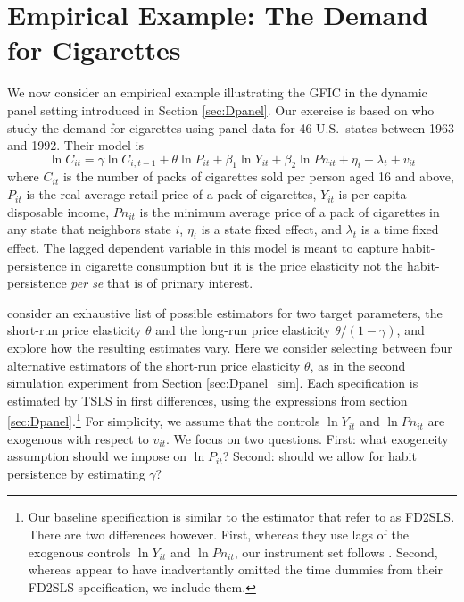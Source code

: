 \section{Empirical Example: The Demand for Cigarettes}
\label{sec:cigarettes}
We now consider an empirical example illustrating the GFIC in the dynamic panel setting introduced in Section \ref{sec:Dpanel}.
Our exercise is based on \cite{BaltagiEtAl2000} who study the demand for cigarettes using panel data for 46 U.S.\ states between 1963 and 1992. 
Their model is
\[
  \ln C_{it} =  \gamma \ln C_{i,t-1} + \theta \ln P_{it} + \beta_1 \ln Y_{it} + \beta_2 \ln Pn_{it} + \eta_i + \lambda_t + v_{it}
\] 
where $C_{it}$ is the number of packs of cigarettes sold per person aged 16 and above, $P_{it}$ is the real average retail price of a pack of cigarettes, $Y_{it}$ is per capita disposable income, $Pn_{it}$ is the minimum average price of a pack of cigarettes in any state that neighbors state $i$, $\eta_i$ is a state fixed effect, and $\lambda_t$ is a time fixed effect.
The lagged dependent variable in this model is meant to capture habit-persistence in cigarette consumption but it is the price elasticity not the habit-persistence \emph{per se} that is of primary interest. 

\cite{BaltagiEtAl2000} consider an exhaustive list of possible estimators for two target parameters, the short-run price elasticity $\theta$ and the long-run price elasticity $\theta/(1 - \gamma)$, and explore how the resulting estimates vary.
Here we consider selecting between four alternative estimators of the short-run price elasticity $\theta$, as in the second simulation experiment from Section \ref{sec:Dpanel_sim}.
Each specification is estimated by TSLS in first differences, using the expressions from section \ref{sec:Dpanel}.\footnote{Our baseline specification is similar to the estimator that \cite{BaltagiEtAl2000} refer to as FD2SLS. There are two differences however. First, whereas they use lags of the exogenous controls $\ln Y_{it}$ and $\ln Pn_{it}$, our instrument set follows \cite{AndersonHsiao}. 
Second, whereas \cite{BaltagiEtAl2000} appear to have inadvertantly omitted the time dummies from their FD2SLS specification, we include them.}
For simplicity, we assume that the controls $\ln Y_{it}$ and $\ln Pn_{it}$ are exogenous with respect to $v_{it}$.
We focus on two questions.
First: what exogeneity assumption should we impose on $\ln P_{it}$?
Second: should we allow for habit persistence by estimating $\gamma$?

